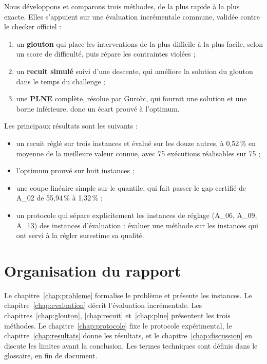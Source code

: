 \documentclass[11pt,a4paper]{report}
\begin{document}
Nous développons et comparons trois méthodes, de la plus rapide à la plus exacte. Elles s'appuient sur
une évaluation incrémentale commune, validée contre le checker officiel :
\begin{enumerate}
  \item un \textbf{glouton} qui place les interventions de la plus difficile à la plus facile, selon un
        score de difficulté, puis répare les contraintes violées ;
  \item un \textbf{recuit simulé} suivi d'une descente, qui améliore la solution du glouton dans le
        temps du challenge ;
  \item une \textbf{PLNE} complète, résolue par Gurobi, qui fournit une solution et une borne
        inférieure, donc un écart prouvé à l'optimum.
\end{enumerate}
Les principaux résultats sont les suivants :
\begin{itemize}
  \item un recuit réglé sur trois instances et évalué sur les douze autres, à 0,52\,\% en moyenne de la
        meilleure valeur connue, avec 75 exécutions réalisables sur 75 ;
  \item l'optimum prouvé sur huit instances ;
  \item une coupe linéaire simple sur le quantile, qui fait passer le gap certifié de A\_02 de 55,94\,\% à
        1,32\,\% ;
  \item un protocole qui sépare explicitement les instances de réglage (A\_06, A\_09, A\_13) des
        instances d'évaluation : évaluer une méthode sur les instances qui ont servi à la régler
        surestime sa qualité.
\end{itemize}

\section{Organisation du rapport}

Le chapitre~\ref{chap:probleme} formalise le problème et présente les instances. Le
chapitre~\ref{chap:evaluation} décrit l'évaluation incrémentale. Les chapitres~\ref{chap:glouton},
\ref{chap:recuit} et~\ref{chap:plne} présentent les trois méthodes. Le chapitre~\ref{chap:protocole}
fixe le protocole expérimental, le chapitre~\ref{chap:resultats} donne les résultats, et le
chapitre~\ref{chap:discussion} en discute les limites avant la conclusion. Les termes techniques sont
définis dans le glossaire, en fin de document.

\end{document}
